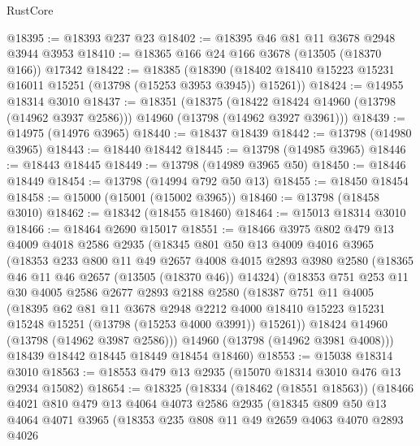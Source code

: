 \begin{lexlean}{RustCore}
\begin{coremodule}
@18395 := @18393 @237 @23
@18402 := @18395 @46 @81 @11 @3678 @2948 @3944 @3953
@18410 := @18365 @166 @24 @166 @3678 (@13505 (@18370 @166)) @17342
@18422 := @18385
    (@18390 (@18402 @18410 @15223 @15231 @16011 @15251 (@13798 (@15253 @3953 @3945)) @15261))
@18424 := @14955 @18314 @3010
@18437 := @18351
    (@18375
      (@18422 @18424 @14960 (@13798 (@14962 @3937 @2586)))
      @14960
      (@13798 (@14962 @3927 @3961)))
@18439 := @14975 (@14976 @3965)
@18440 := @18437 @18439
@18442 := @13798 (@14980 @3965)
@18443 := @18440 @18442
@18445 := @13798 (@14985 @3965)
@18446 := @18443 @18445
@18449 := @13798 (@14989 @3965 @50)
@18450 := @18446 @18449
@18454 := @13798 (@14994 @792 @50 @13)
@18455 := @18450 @18454
@18458 := @15000 (@15001 (@15002 @3965))
@18460 := @13798 (@18458 @3010)
@18462 := @18342 (@18455 @18460)
@18464 := @15013 @18314 @3010
@18466 := @18464 @2690 @15017
@18551 := @18466
    @3975
    @802
    @479
    @13
    @4009
    @4018
    @2586
    @2935
    (@18345
      @801
      @50
      @13
      @4009
      @4016
      @3965
      (@18353
        @233
        @800
        @11
        @49
        @2657
        @4008
        @4015
        @2893
        @3980
        @2580
        (@18365 @46 @11 @46 @2657 (@13505 (@18370 @46)) @14324)
        (@18353
          @751
          @253
          @11
          @30
          @4005
          @2586
          @2677
          @2893
          @2188
          @2580
          (@18387
            @751
            @11
            @4005
            (@18395
              @62
              @81
              @11
              @3678
              @2948
              @2212
              @4000
              @18410
              @15223
              @15231
              @15248
              @15251
              (@13798 (@15253 @4000 @3991))
              @15261))
          @18424
          @14960
          (@13798 (@14962 @3987 @2586)))
        @14960
        (@13798 (@14962 @3981 @4008)))
      @18439
      @18442
      @18445
      @18449
      @18454
      @18460)
@18553 := @15038 @18314 @3010
@18563 := @18553 @479 @13 @2935 (@15070 @18314 @3010 @476 @13 @2934 @15082)
@18654 := @18325
    (@18334
      (@18462 (@18551 @18563))
      (@18466
        @4021
        @810
        @479
        @13
        @4064
        @4073
        @2586
        @2935
        (@18345
          @809
          @50
          @13
          @4064
          @4071
          @3965
          (@18353
            @235
            @808
            @11
            @49
            @2659
            @4063
            @4070
            @2893
            @4026

\end{coremodule}
\end{lexlean}
